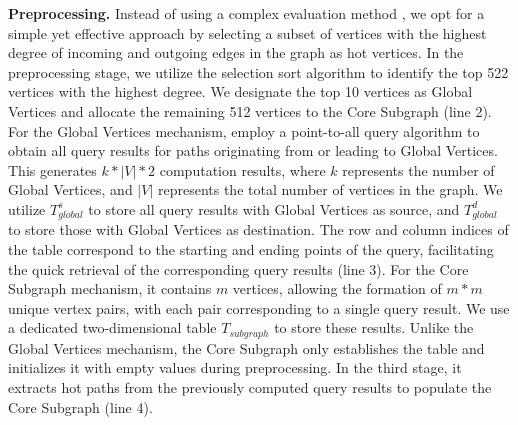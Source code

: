 \documentclass[10pt,journal,compsoc]{IEEEtran}
\begin{document}
{\bf{Preprocessing.}} 
Instead of using a complex evaluation method \cite{china2}, we opt for a simple yet effective approach by selecting a subset of vertices with the highest degree of incoming and outgoing edges in the graph as hot vertices. In the preprocessing stage, we utilize the selection sort algorithm to identify the top 522 vertices with the highest degree. We designate the top 10 vertices as Global Vertices and allocate the remaining 512 vertices to the Core Subgraph (line 2).
For the Global Vertices mechanism, employ a point-to-all query algorithm to obtain all query results for paths originating from or leading to Global Vertices.
This generates $k*|V|*2$ computation results, where $k$ represents the number of Global Vertices, and $|V|$ represents the total number of vertices in the graph.
We utilize $T_{global}^s$ to store all query results with Global Vertices as source, and $T_{global}^d$ to store those with Global Vertices as destination. The row and column indices of the table correspond to the starting and ending points of the query, facilitating the quick retrieval of the corresponding query results (line 3).
For the Core Subgraph mechanism, it contains $m$ vertices, allowing the formation of $m*m$ unique vertex pairs, with each pair corresponding to a single query result. We use a dedicated two-dimensional table $T_{subgraph}$ to store these results. Unlike the Global Vertices mechanism, the Core Subgraph only establishes the table and initializes it with empty values during preprocessing. In the third stage, it extracts hot paths from the previously computed query results to populate the Core Subgraph (line 4).
\end{document}
